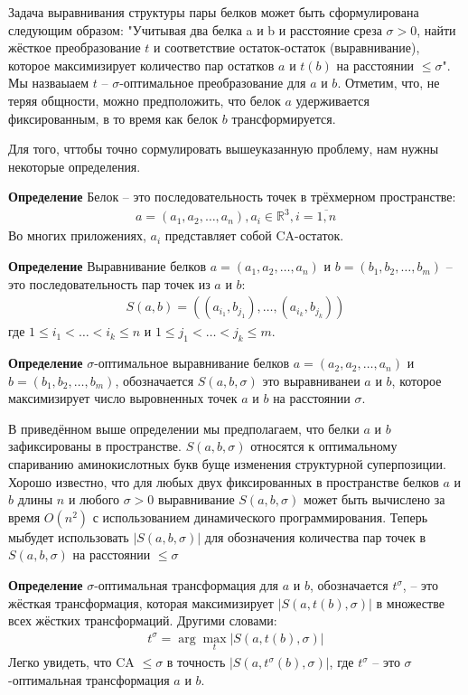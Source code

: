 \documentclass[a4papper]{article}
\newcommand{\bb}{\textbf}
\begin{document}
Задача выравнивания структуры пары белков может быть сформулирована следующим образом: "Учитывая два белка a и b и расстояние среза $\sigma > 0$, найти жёсткое преобразование $t$ и соответствие остаток-остаток (выравнивание), которое максимизирует количество пар остатков $a$ и $t(b)$ на расстоянии $\leq \sigma$". Мы назваыаем $t$ -- $\sigma$-оптимальное преобразование для $a$ и $b$. Отметим, что, не теряя общности, можно предположить, что белок $a$ удерживается фиксированным, в то время как белок $b$ трансформируется.

Для того, чттобы точно сормулировать вышеуказанную проблему, нам нужны некоторые определения.

\bb{Определение} Белок -- это последовательность точек в трёхмерном пространстве:
\begin{gather*}
a = (a_1, a_2, \dots, a_n), a_i \in \mathbb{R}^3, i = \overline{1, n}
\end{gather*}
Во многих приложениях, $ a_i$ представляет собой CA-остаток.

\bb{Определение} Выравнивание белков $a = (a_1, a_2, \dots, a_n)$ и $b = (b_1, b_2, \dots, b_m)$ -- это последовательность пар точек из $a$ и $b$:
\begin{gather*}
S(a, b) = ((a_{i_1}, b_{j_1}), \dots, (a_{i_k}, b_{j_k}))
\end{gather*}
где $1 \leq i_1 < \dots < i_k \leq n$ и $1 \leq j_1 < \dots < j_k \leq m$.

\bb{Определение} $\sigma$-оптимальное выравнивание белков $a = (a_2, a_2, \dots, a_n)$ и $b = (b_1, b_2, \dots, b_m)$, обозначается $S(a, b, \sigma)$ это выравниванеи $a$ и $b$, которое максимизирует число выровненных точек $a$ и $b$ на расстоянии $\sigma$.

В приведённом выше определении мы предполагаем, что белки $a$ и $b$ зафиксированы в пространстве. $S(a, b, \sigma )$ относятся к оптимальному спариванию аминокислотных букв буще изменения структурной суперпозиции. Хорошо известно, что для любых двух фиксированных в пространстве белков $a$ и $b$ длины $n$ и любого $\sigma > 0$  выравнивание $S(a, b, \sigma )$ может быть вычислено за время $O(n^2)$ с использованием динамического программирования. Теперь мыбудет использовать $|S(a, b, \sigma )|$ для обозначения количества пар точек в $S(a, b, \sigma )$ на расстоянии $\leq \sigma$

\bb{Определение} $\sigma$-оптимальная трансформация для $a$ и $b$, обозначается $t^\sigma$, -- это жёсткая трансформация, которая максимизирует $|S(a, t(b), \sigma)|$ в множестве всех жёстких трансформаций. Другими словами:
\begin{gather*}
t^\sigma = \arg \max_t |S(a, t(b), \sigma)|
\end{gather*}
Легко увидеть, что CA $\leq \sigma$ в точность $|S(a, t^\sigma (b), \sigma)|$, где $t^\sigma$ -- это $\sigma$-оптимальная трансформация $a$ и $b$.
\end{document}
